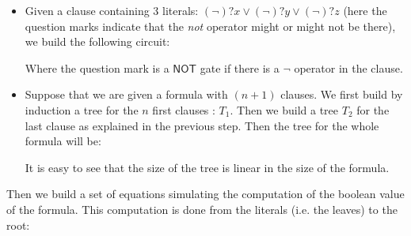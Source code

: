 \documentclass[a4paper,10pt]{article}
\theoremstyle{remark}
\begin{document}
\begin{itemize}
 \item Given a clause containing 3 literals: $(\lnot)? x \lor(\lnot)?
y\lor(\lnot)?z$ (here the question marks indicate that the \emph{not} operator
might or might not be there), we build the following circuit:

\begin{figure}[h]
\begin{center}
\end{center}
\end{figure}

Where the question mark is a $\textsf{NOT}$ gate if there is a $\lnot$
operator in the clause.

\item Suppose that we are given a formula with $(n+1)$ clauses. We first build
by induction a tree for the $n$ first clauses : $T_1$. Then we build a
tree $T_2$ for the last clause as explained in the previous step. Then the tree
for the whole formula will be:
\newpage
\begin{figure}[h]
\begin{center}
\end{center}
\end{figure}

It is easy to see that the size of the tree is linear in the size of the
formula.
\end{itemize}

Then we build a set of equations simulating the computation of the boolean
value of the formula. This computation is done from the literals (i.e. the
leaves) to the root: 
\end{document}
